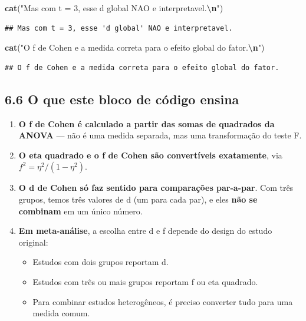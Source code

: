 \documentclass[
]{article}
\newenvironment{Shaded}{\begin{snugshade}}{\end{snugshade}}
\newcommand{\FunctionTok}[1]{\textcolor[rgb]{0.13,0.29,0.53}{\textbf{#1}}}
\newcommand{\NormalTok}[1]{#1}
\newcommand{\SpecialCharTok}[1]{\textcolor[rgb]{0.81,0.36,0.00}{\textbf{#1}}}
\newcommand{\StringTok}[1]{\textcolor[rgb]{0.31,0.60,0.02}{#1}}
\providecommand{\tightlist}{%
  \setlength{\itemsep}{0pt}\setlength{\parskip}{0pt}}
\begin{document}
\begin{Shaded}
\begin{Highlighting}[]
\FunctionTok{cat}\NormalTok{(}\StringTok{"Mas com t = 3, esse \textquotesingle{}d global\textquotesingle{} NAO e interpretavel.}\SpecialCharTok{\textbackslash{}n}\StringTok{"}\NormalTok{)}
\end{Highlighting}
\end{Shaded}

\begin{verbatim}
## Mas com t = 3, esse 'd global' NAO e interpretavel.
\end{verbatim}

\begin{Shaded}
\begin{Highlighting}[]
\FunctionTok{cat}\NormalTok{(}\StringTok{"O f de Cohen e a medida correta para o efeito global do fator.}\SpecialCharTok{\textbackslash{}n}\StringTok{"}\NormalTok{)}
\end{Highlighting}
\end{Shaded}

\begin{verbatim}
## O f de Cohen e a medida correta para o efeito global do fator.
\end{verbatim}

\subsection{6.6 O que este bloco de código
ensina}\label{o-que-este-bloco-de-cuxf3digo-ensina}

\begin{enumerate}
\def\labelenumi{\arabic{enumi}.}
\tightlist
\item
  \textbf{O f de Cohen é calculado a partir das somas de quadrados da
  ANOVA} --- não é uma medida separada, mas uma transformação do teste
  F.
\item
  \textbf{O eta quadrado e o f de Cohen são convertíveis exatamente},
  via \(f^2 = \eta^2 / (1 - \eta^2)\).
\item
  \textbf{O d de Cohen só faz sentido para comparações par-a-par}. Com
  três grupos, temos três valores de d (um para cada par), e eles
  \textbf{não se combinam} em um único número.
\item
  \textbf{Em meta-análise}, a escolha entre d e f depende do design do
  estudo original:

  \begin{itemize}
  \tightlist
  \item
    Estudos com dois grupos reportam d.
  \item
    Estudos com três ou mais grupos reportam f ou eta quadrado.
  \item
    Para combinar estudos heterogêneos, é preciso converter tudo para
    uma medida comum.
  \end{itemize}
\end{enumerate}
\end{document}
